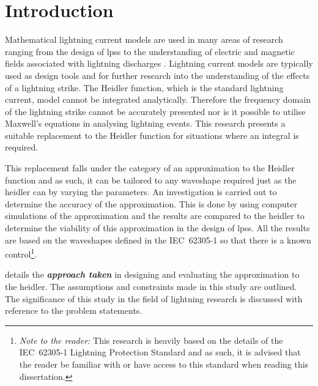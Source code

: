 
\chapter{Introduction} %

\label{ChapterIntro} %


Mathematical lightning current models are used in many areas of research ranging from the design of \glspl{lps} to the understanding of electric and magnetic fields associated with lightning discharges \cite{IEC623051, ZhangFeizhouandLiuShanghe2002}.
Lightning current models are typically used as design tools and for further research into the understanding of the effects of a lightning strike.
The Heidler function, which is the standard lightning current, model cannot be integrated analytically. Therefore the frequency domain of the lightning strike cannot be accurately presented nor is it possible to utilise Maxwell's equations in analysing lightning events. This research presents a suitable replacement to the Heidler function for situations where an integral is required.

This replacement falls under the category of an approximation to the Heidler function and as such, it can be tailored to any waveshape required just as the \gls{heidler} can by varying the parameters.
An investigation is carried out to determine the accuracy of the approximation. This is done by using computer simulations of the approximation and the results are compared to the \gls{heidler} to determine the viability of this approximation in the design of \glspl{lps}. All the results are based on the waveshapes defined in the IEC~62305-1 so that there is a known control\footnote{\textit{Note to the reader:} This research is heavily based on the details of the IEC~62305-1 Lightning Protection Standard and as such, it is advised that the reader be familiar with or have access to this standard when reading this dissertation.}.

 details the \textbf{\textit{approach taken}} in designing and evaluating the approximation to the \gls{heidler}. The assumptions and constraints made in this study are outlined. The significance of this study in the field of lightning research is discussed with reference to the problem statements.

